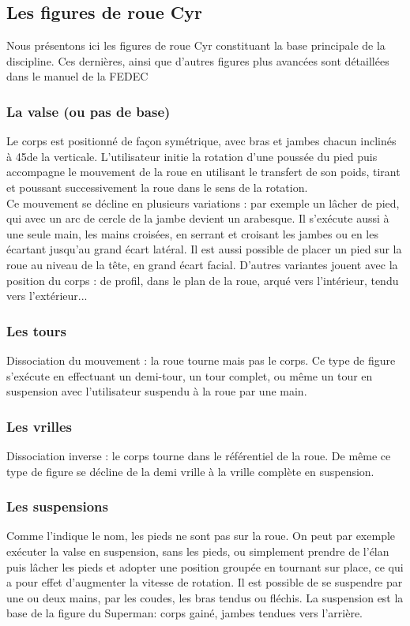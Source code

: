 \subsection{Les figures de roue Cyr}
Nous présentons ici les figures de roue Cyr constituant la base principale de la discipline. Ces dernières, ainsi que d'autres figures plus avancées sont détaillées dans le manuel de la FEDEC \cite{Fedec2011}
\subsubsection{La valse (ou pas de base)}
Le corps est positionné de façon symétrique, avec bras et jambes chacun inclinés à 45\degree de la verticale. L'utilisateur initie la rotation d'une poussée du pied puis accompagne le mouvement de la roue en utilisant le transfert de son poids, tirant et poussant successivement la roue dans le sens de la rotation.\\
Ce mouvement se décline en plusieurs variations : par exemple un lâcher de pied, qui avec un arc de cercle de la jambe devient un arabesque. Il s'exécute aussi à une seule main, les mains croisées, en serrant et croisant les jambes ou en les écartant jusqu'au grand écart latéral. Il est aussi possible de placer un pied sur la roue au niveau de la tête, en grand écart facial. D'autres variantes jouent avec la position du corps : de profil, dans le plan de la roue, arqué vers l'intérieur, tendu vers l'extérieur...



\subsubsection{Les tours}
Dissociation du mouvement : la roue tourne mais pas le corps. Ce type de figure s'exécute en effectuant un demi-tour, un tour complet, ou même un tour en suspension avec l'utilisateur suspendu à la roue par une main.

\subsubsection{Les vrilles}
Dissociation inverse : le corps tourne dans le référentiel de la roue. De même ce type de figure se décline de la demi vrille à la vrille complète en suspension.

\subsubsection{Les suspensions}
Comme l'indique le nom, les pieds ne sont pas sur la roue. On peut par exemple exécuter la valse en suspension, sans les pieds, ou simplement prendre de l'élan puis lâcher les pieds et adopter une position groupée en tournant sur place, ce qui a pour effet d'augmenter la vitesse de rotation. Il est possible de se suspendre par une ou deux mains, par les coudes, les bras tendus ou fléchis. La suspension est la base de la figure du Superman: corps gainé, jambes tendues vers l'arrière.

